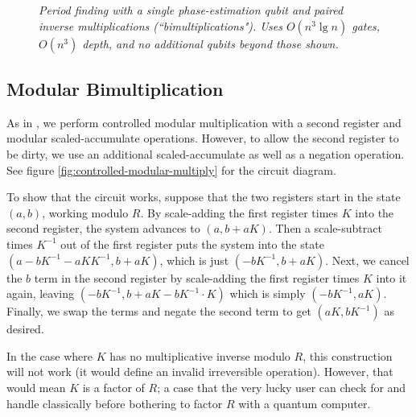\documentclass[twocolumn]{article}
\begin{document}
\begin{figure}
  \centering
  \caption{\em
	Period finding with a single phase-estimation qubit and paired inverse multiplications (``bimultiplications").
	Uses $O(n^3 \lg n)$ gates, $O(n^3)$ depth, and no additional qubits beyond those shown.
  }
  \label{fig:period-finding-solo-phase-qubit-explicit-dirty-register}
\end{figure}


\subsection{Modular Bimultiplication}

As in \cite{beauregard2003}, we perform controlled modular multiplication with a second register and modular scaled-accumulate operations.
However, to allow the second register to be dirty, we use an additional scaled-accumulate as well as a negation operation.
See figure \ref{fig:controlled-modular-multiply} for the circuit diagram.

To show that the circuit works, suppose that the two registers start in the state $(a, b)$, working modulo $R$.
By scale-adding the first register times $K$ into the second register, the system advances to $(a, b+aK)$.
Then a scale-subtract times $K^{-1}$ out of the first register puts the system into the state $(a-bK^{-1}-aKK^{-1}, b+aK)$, which is just $(-bK^{-1}, b+aK)$.
Next, we cancel the $b$ term in the second register by scale-adding the first register times $K$ into it again, leaving $(-bK^{-1}, b+aK-bK^{-1} \cdot K)$ which is simply $(-bK^{-1}, aK)$.
Finally, we swap the terms and negate the second term to get $(aK, bK^{-1})$ as desired.

In the case where $K$ has no multiplicative inverse modulo $R$, this construction will not work (it would define an invalid irreversible operation).
However, that would mean $K$ is a factor of $R$; a case that the very lucky user can check for and handle classically before bothering to factor $R$ with a quantum computer.
\end{document}
